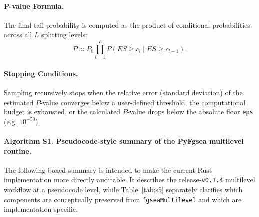 \documentclass[11pt]{article}
\begin{document}
\paragraph{P-value Formula.}
The final tail probability is computed as the product of conditional probabilities across all $L$ splitting levels:
\[
P \approx P_0 \prod_{l=1}^{L} P\!\left(ES \ge c_l \mid ES \ge c_{l-1}\right).
\]

\paragraph{Stopping Conditions.}
Sampling recursively stops when the relative error (standard deviation) of the estimated $P$-value converges below a user-defined threshold, the computational budget is exhausted, or the calculated $P$-value drops below the absolute floor \texttt{eps} (e.g. $10^{-50}$).

\paragraph{Algorithm S1. Pseudocode-style summary of the PyFgsea multilevel routine.}
The following boxed summary is intended to make the current Rust implementation more directly auditable. It describes the release-\texttt{v0.1.4} multilevel workflow at a pseudocode level, while Table~\ref{tab:s5} separately clarifies which components are conceptually preserved from \texttt{fgseaMultilevel} and which are implementation-specific.
\end{document}
